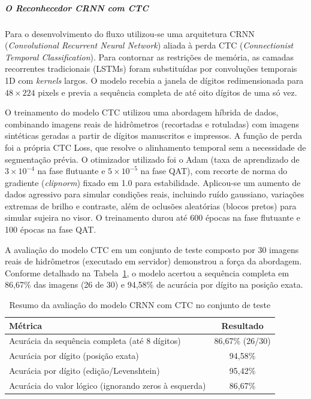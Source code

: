 \subparagraph{O Reconhecedor CRNN com CTC}
Para o desenvolvimento do fluxo utilizou-se uma arquitetura CRNN
(\textit{Convolutional Recurrent Neural Network}) aliada à perda CTC
(\textit{Connectionist Temporal Classification}). Para contornar as restrições de memória,
as camadas recorrentes tradicionais (LSTMs) foram substituídas por convoluções temporais
1D com \textit{kernels} largos. O modelo recebia a janela de dígitos redimensionada para
\(48 \times 224\) pixels e previa a sequência completa de até oito dígitos de uma só vez.

O treinamento do modelo CTC utilizou uma abordagem híbrida de dados, combinando imagens
reais de hidrômetros (recortadas e rotuladas) com imagens sintéticas geradas a partir de
dígitos manuscritos e impressos. A função de perda foi a própria CTC Loss, que resolve o
alinhamento temporal sem a necessidade de segmentação prévia. O otimizador utilizado foi
o Adam (taxa de aprendizado de \(3 \times 10^{-4}\) na fase flutuante e
\(5 \times 10^{-5}\) na fase QAT), com recorte de norma do gradiente
(\textit{clipnorm}) fixado em 1.0 para estabilidade. Aplicou-se um aumento de dados
agressivo para simular condições reais, incluindo ruído gaussiano, variações extremas de
brilho e contraste, além de oclusões aleatórias (blocos pretos) para simular sujeira no
visor. O treinamento durou até 600 épocas na fase flutuante e 100 épocas na fase QAT.

A avaliação do modelo CTC em um conjunto de teste composto por 30 imagens reais de
hidrômetros (executado em servidor) demonstrou a força da abordagem. Conforme detalhado na
Tabela~\ref{tab:resultado_ctc}, o modelo acertou a sequência completa em 86,67\%
das imagens (26 de 30) e 94,58\% de acurácia por dígito na posição exata.

\begin{table}[H]
    \centering
    \caption{Resumo da avaliação do modelo CRNN com CTC no conjunto de teste}
    \label{tab:resultado_ctc}
    \begin{tabular}{@{}lc@{}}
        \toprule
        \textbf{Métrica} & \textbf{Resultado} \\
        \midrule
        Acurácia da sequência completa (até 8 dígitos) & 86,67\% (26/30) \\
        Acurácia por dígito (posição exata) & 94,58\% \\
        Acurácia por dígito (edição/Levenshtein) & 95,42\% \\
        Acurácia do valor lógico (ignorando zeros à esquerda) & 86,67\% \\
        \bottomrule
    \end{tabular}
\end{table}

